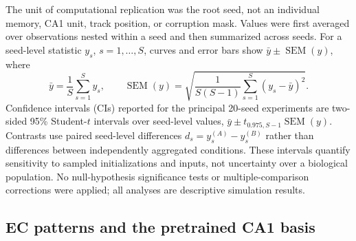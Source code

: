 The unit of computational replication was the root seed, not an individual
memory, CA1 unit, track position, or corruption mask. Values were first
averaged over observations nested within a seed and then summarized across
seeds. For a seed-level statistic $y_s$, $s=1,\ldots,S$, curves and error bars
show $\bar y\pm\operatorname{SEM}(y)$, where
\begin{equation}
\bar y=\frac{1}{S}\sum_{s=1}^{S}y_s,\qquad
\operatorname{SEM}(y)=
\sqrt{\frac{1}{S(S-1)}\sum_{s=1}^{S}(y_s-\bar y)^2}.
\end{equation}
Confidence intervals (CIs) reported for the principal 20-seed experiments are
two-sided 95\% Student-$t$ intervals over seed-level values,
$\bar y\pm t_{0.975,S-1}\operatorname{SEM}(y)$. Contrasts use paired
seed-level differences $d_s=y_s^{(A)}-y_s^{(B)}$ rather than differences
between independently aggregated conditions. These intervals
quantify sensitivity to sampled initializations and inputs, not uncertainty
over a biological population. No null-hypothesis significance tests or
multiple-comparison corrections were applied; all analyses are descriptive
simulation results.

\subsection{EC patterns and the pretrained CA1 basis}

